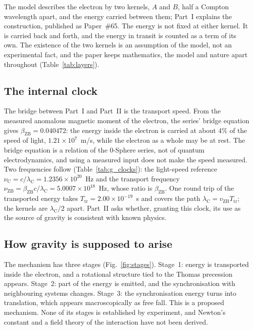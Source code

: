 \documentclass[%
 reprint, amsmath,amssymb, aps, prb, ]{revtex4-2}
\numberwithin{equation}{section}
\newcommand{\vZB}{v_{\text{ZB}}}
\newcommand{\betaZB}{\beta_{\text{ZB}}}
\newcommand{\lambdaC}{\lambda_{\text{C}}}
\newcommand{\nuZB}{\nu_{\text{ZB}}}
\newcommand{\nuC}{\nu_{\text{C}}}
\newcommand{\Ttr}{T_{\text{tr}}}
\begin{document}
The model describes the electron by two kernels, $A$ and $B$, half a Compton wavelength apart, and the energy carried between them; Part~I explains the construction, published as Paper~\#65. The energy is not fixed at either kernel. It is carried back and forth, and the energy in transit is counted as a term of its own. The existence of the two kernels is an assumption of the model, not an experimental fact, and the paper keeps mathematics, the model and nature apart throughout (Table~\ref{tab:layers}).

\subsection{The internal clock}

The bridge between Part~I and Part~II is the transport speed. From the measured anomalous magnetic moment of the electron, the series' bridge equation gives $\betaZB = 0.040472$: the energy inside the electron is carried at about $4\%$ of the speed of light, $1.21\times10^{7}$~m/s, while the electron as a whole may be at rest. The bridge equation is a relation of the 0-Sphere series, not of quantum electrodynamics, and using a measured input does not make the speed measured. Two frequencies follow (Table~\ref{tab:g_clocks}): the light-speed reference $\nuC = c/\lambdaC = 1.2356\times10^{20}$~Hz and the transport frequency $\nuZB = \betaZB c/\lambdaC = 5.0007\times10^{18}$~Hz, whose ratio is $\betaZB$. One round trip of the transported energy takes $\Ttr = 2.00\times10^{-19}$~s and covers the path $\lambdaC = \vZB\Ttr$; the kernels are $\lambdaC/2$ apart. Part~II asks whether, granting this clock, its use as the source of gravity is consistent with known physics.

\subsection{How gravity is supposed to arise}

The mechanism has three stages (Fig.~\ref{fig:stages}). Stage~1: energy is transported inside the electron, and a rotational structure tied to the Thomas precession appears. Stage~2: part of the energy is emitted, and the synchronisation with neighbouring systems changes. Stage~3: the synchronisation energy turns into translation, which appears macroscopically as free fall. This is a proposed mechanism. None of its stages is established by experiment, and Newton's constant and a field theory of the interaction have not been derived.
\end{document}
